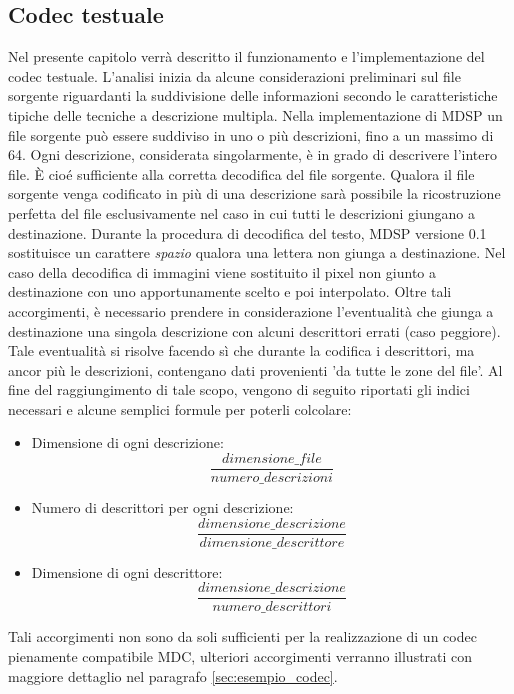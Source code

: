 \subsection{Codec testuale}
\label{cap:implementazione_codec}
Nel presente capitolo verrà descritto il funzionamento e l'implementazione
del codec testuale. L'analisi inizia da alcune considerazioni preliminari sul
file sorgente riguardanti la suddivisione delle informazioni secondo le
caratteristiche tipiche delle tecniche a descrizione multipla. Nella
implementazione di MDSP un file sorgente può essere suddiviso in uno o più
descrizioni, fino a un massimo di 64. Ogni descrizione, considerata
singolarmente, è in grado di descrivere l'intero file. \`E cioé sufficiente
alla corretta decodifica del file sorgente. Qualora il file sorgente venga
codificato in più di una descrizione sarà possibile la ricostruzione
perfetta del file esclusivamente nel caso in cui tutti le descrizioni giungano
a destinazione. Durante la procedura di decodifica del testo, MDSP versione 0.1
sostituisce un carattere \emph{spazio} qualora una lettera non giunga a
destinazione. Nel caso della decodifica di immagini viene sostituito il
pixel non giunto a destinazione con uno apportunamente scelto e
poi interpolato. Oltre tali accorgimenti, è necessario prendere in
considerazione l'eventualità che giunga a destinazione una singola descrizione
con alcuni descrittori errati (caso peggiore). Tale eventualità si risolve
facendo sì che durante la codifica i descrittori, ma ancor più le descrizioni,
contengano dati provenienti 'da tutte le zone del file'. Al fine del
raggiungimento di tale scopo, vengono di seguito riportati gli indici necessari
e alcune semplici formule per poterli colcolare:
\begin{itemize}
 \item Dimensione di ogni descrizione: $$\frac{dimensione\_file}{numero\_descrizioni}$$
 \item Numero di descrittori per ogni descrizione: $$\frac{dimensione\_descrizione}{dimensione\_descrittore}$$
 \item Dimensione di ogni descrittore: $$\frac{dimensione\_descrizione}{numero\_descrittori}$$
\end{itemize}
Tali accorgimenti non sono da soli sufficienti per la realizzazione di un codec
pienamente compatibile MDC, ulteriori accorgimenti verranno illustrati con
maggiore dettaglio nel paragrafo \ref{sec:esempio_codec}.

